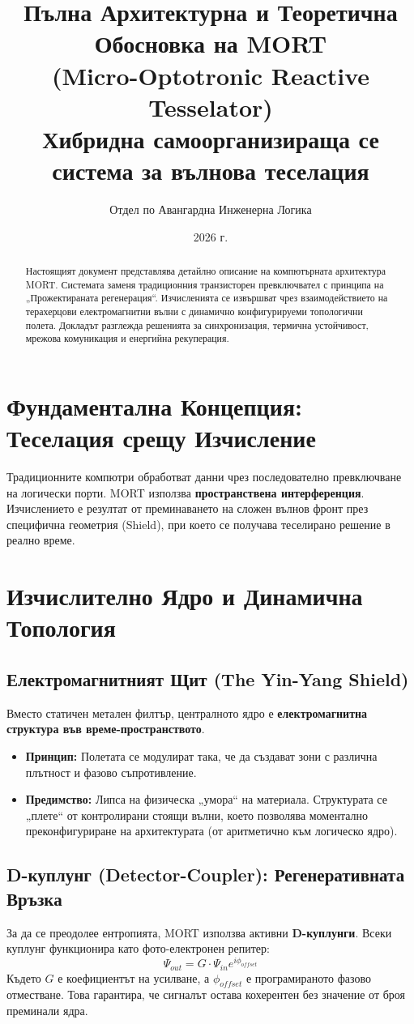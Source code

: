 \documentclass[12pt,a4paper]{article}
\title{\textbf{Пълна Архитектурна и Теоретична Обосновка на MORT} \\ \large (Micro-Optotronic Reactive Tesselator) \\ \small Хибридна самоорганизираща се система за вълнова теселация}
\author{Отдел по Авангардна Инженерна Логика}
\date{2026 г.}
\begin{document}
\maketitle

\begin{abstract}
Настоящият документ представлява детайлно описание на компютърната архитектура MORT. Системата заменя традиционния транзисторен превключвател с принципа на „Прожектираната регенерация“. Изчисленията се извършват чрез взаимодействието на терахерцови електромагнитни вълни с динамично конфигурируеми топологични полета. Докладът разглежда решенията за синхронизация, термична устойчивост, мрежова комуникация и енергийна рекуперация.
\end{abstract}

\tableofcontents
\newpage

\section{Фундаментална Концепция: Теселация срещу Изчисление}
Традиционните компютри обработват данни чрез последователно превключване на логически порти. MORT използва \textbf{пространствена интерференция}. Изчислението е резултат от преминаването на сложен вълнов фронт през специфична геометрия (Shield), при което се получава теселирано решение в реално време.

\section{Изчислително Ядро и Динамична Топология}

\subsection{Електромагнитният Щит (The Yin-Yang Shield)}
Вместо статичен метален филтър, централното ядро е \textbf{електромагнитна структура във време-пространството}. 
\begin{itemize}
    \item \textbf{Принцип:} Полетата се модулират така, че да създават зони с различна плътност и фазово съпротивление.
    \item \textbf{Предимство:} Липса на физическа „умора“ на материала. Структурата се „плете“ от контролирани стоящи вълни, което позволява моментално преконфигуриране на архитектурата (от аритметично към логическо ядро).
\end{itemize}

\subsection{D-куплунг (Detector-Coupler): Регенеративната Връзка}
За да се преодолее ентропията, MORT използва активни \textbf{D-куплунги}. Всеки куплунг функционира като фото-електронен репитер:
\begin{equation}
    \Psi_{out} = G \cdot \Psi_{in} e^{i\phi_{offset}}
\end{equation}
Където $G$ е коефициентът на усилване, а $\phi_{offset}$ е програмираното фазово отместване. Това гарантира, че сигналът остава кохерентен без значение от броя преминали ядра.
\end{document}
